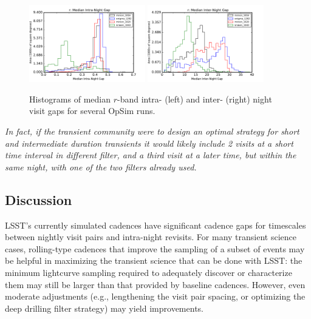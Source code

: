 \begin{figure}[hbt]
\centerline{
	\includegraphics[width=0.45\textwidth]{figs/transients/MedianIntra-NightGap_r.pdf}
	\includegraphics[width=0.45\textwidth]{figs/transients/MedianInter-NightGap_r.pdf}
}
\caption{ Histograms of median $r$-band intra- (left) and inter- (right)
night visit gaps for several OpSim runs. }
\label{fig:tgaps_r}
\end{figure}

\emph{In fact, if the transient community were to design an optimal strategy for short and intermediate duration transients it would likely include 2 visits at a short time interval in different filter, and a third visit at a later time, but within the same night, with one of the two filters already used.}




\subsection{Discussion}
\label{sec:\chpname:discussion}

LSST's currently simulated cadences have significant cadence gaps for
timescales between nightly visit pairs and intra-night revisits.  For
many transient science cases, rolling-type cadences that improve the
sampling of a subset of events may be helpful in maximizing the
transient science that can be done with LSST: the minimum lightcurve
sampling required to adequately discover or characterize them may
still be larger than that provided by baseline cadences.  However,
even moderate adjustments (e.g., lengthening the visit pair spacing,
or optimizing the deep drilling filter strategy) may yield
improvements.


